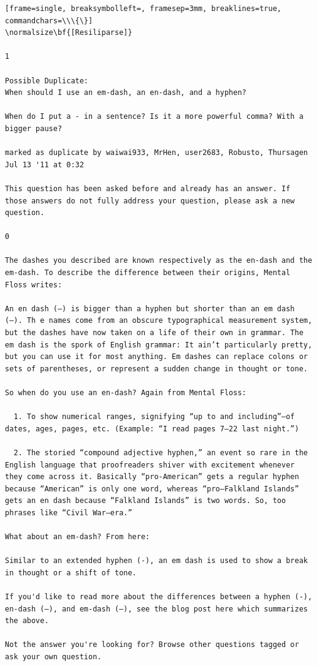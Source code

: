 \documentclass{article}
\begin{document}
\begin{tiny}
\begin{Verbatim}[frame=single, breaksymbolleft=, framesep=3mm, breaklines=true, commandchars=\\\{\}]
\normalsize\bf{[Resiliparse]}

1

Possible Duplicate:
When should I use an em-dash, an en-dash, and a hyphen?

When do I put a - in a sentence? Is it a more powerful comma? With a bigger pause?

marked as duplicate by waiwai933, MrHen, user2683, Robusto, Thursagen Jul 13 '11 at 0:32

This question has been asked before and already has an answer. If those answers do not fully address your question, please ask a new question.

0

The dashes you described are known respectively as the en-dash and the em-dash. To describe the difference between their origins, Mental Floss writes:

An en dash (–) is bigger than a hyphen but shorter than an em dash (—). Th e names come from an obscure typographical measurement system, but the dashes have now taken on a life of their own in grammar. The em dash is the spork of English grammar: It ain’t particularly pretty, but you can use it for most anything. Em dashes can replace colons or sets of parentheses, or represent a sudden change in thought or tone.

So when do you use an en-dash? Again from Mental Floss:

  1. To show numerical ranges, signifying “up to and including”—of dates, ages, pages, etc. (Example: “I read pages 7–22 last night.”)

  2. The storied “compound adjective hyphen,” an event so rare in the English language that proofreaders shiver with excitement whenever they come across it. Basically “pro-American” gets a regular hyphen because “American” is only one word, whereas “pro–Falkland Islands” gets an en dash because “Falkland Islands” is two words. So, too phrases like “Civil War–era.”

What about an em-dash? From here:

Similar to an extended hyphen (-), an em dash is used to show a break in thought or a shift of tone.

If you'd like to read more about the differences between a hyphen (-), en-dash (–), and em-dash (—), see the blog post here which summarizes the above.

Not the answer you're looking for? Browse other questions tagged or ask your own question.
\end{Verbatim}
\end{tiny}
\end{document}
